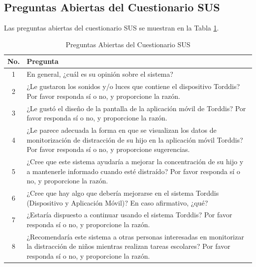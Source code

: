 \documentclass[a4paper,fleqn]{cas-sc}
\begin{document}
	\subsection[\appendixname~\thesection]{Preguntas Abiertas del Cuestionario SUS}
	\label{Appendix:OpenQuestions}
	Las preguntas abiertas del cuestionario SUS se muestran en la Tabla \ref{tab:OpenQuestion}.
	\begin{table}[bt!]
		\centering
		\caption{Preguntas Abiertas del Cuestionario SUS \label{tab:OpenQuestion}}
		\begin{tabularx}{\textwidth}{c X }
			\toprule
			\textbf{No.} & \textbf{Pregunta} \\
			\midrule
			1 & En general, ¿cuál es su opinión sobre el sistema? \\
			2 & ¿Le gustaron los sonidos y/o luces que contiene el dispositivo Torddis? Por favor responda sí o no, y proporcione la razón. \\
			3 & ¿Le gustó el diseño de la pantalla de la aplicación móvil de Torddis? Por favor responda sí o no, y proporcione la razón. \\
			4 & ¿Le parece adecuada la forma en que se visualizan los datos de monitorización de distracción de su hijo en la aplicación móvil Torddis? Por favor responda sí o no, y proporcione sugerencias. \\
			5 & ¿Cree que este sistema ayudaría a mejorar la concentración de su hijo y a mantenerle informado cuando esté distraído? Por favor responda sí o no, y proporcione la razón. \\
			6 & ¿Cree que hay algo que debería mejorarse en el sistema Torddis (Dispositivo y Aplicación Móvil)? En caso afirmativo, ¿qué? \\
			7 & ¿Estaría dispuesto a continuar usando el sistema Torddis? Por favor responda sí o no, y proporcione la razón. \\
			8 & ¿Recomendaría este sistema a otras personas interesadas en monitorizar la distracción de niños mientras realizan tareas escolares? Por favor responda sí o no, y proporcione la razón. \\ \bottomrule
		\end{tabularx}
	\end{table}
\end{document}
